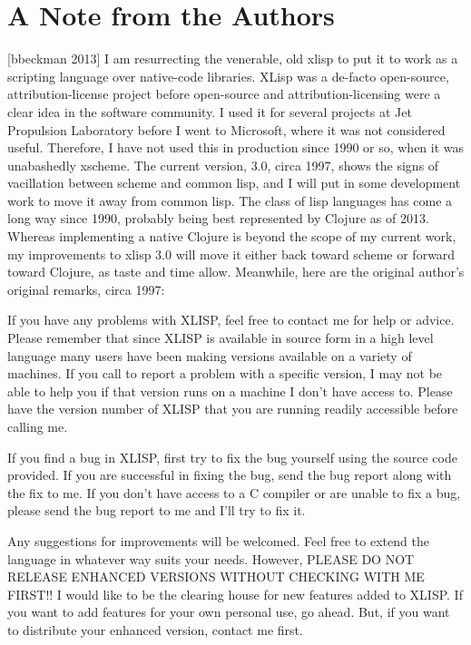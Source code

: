\documentclass[11pt]{article}
\begin{document}
\section{A Note from the Authors}
\label{sec-3}

[bbeckman 2013] I am resurrecting the venerable, old xlisp to put it
to work as a scripting language over native-code libraries.  XLisp was
a de-facto open-source, attribution-license project before open-source
and attribution-licensing were a clear idea in the software community.
I used it for several projects at Jet Propulsion Laboratory before I
went to Microsoft, where it was not considered useful.  Therefore, I
have not used this in production since 1990 or so, when it was
unabashedly xscheme.  The current version, 3.0, circa 1997, shows the
signs of vacillation between scheme and common lisp, and I will put in
some development work to move it away from common lisp.  The class of
lisp languages has come a long way since 1990, probably being best
represented by Clojure as of 2013.  Whereas implementing a native
Clojure is beyond the scope of my current work, my improvements to
xlisp 3.0 will move it either back toward scheme or forward toward
Clojure, as taste and time allow.  Meanwhile, here are the original
author's original remarks, circa 1997:

If you have any problems with XLISP, feel free to contact me for help
or advice.  Please remember that since XLISP is available in source
form in a high level language many users have been making versions
available on a variety of machines.  If you call to report a problem
with a specific version, I may not be able to help you if that version
runs on a machine I don't have access to.  Please have the version
number of XLISP that you are running readily accessible before calling
me.

If you find a bug in XLISP, first try to fix the bug yourself using
the source code provided.  If you are successful in fixing the bug,
send the bug report along with the fix to me.  If you don't have
access to a C compiler or are unable to fix a bug, please send the bug
report to me and I'll try to fix it.

Any suggestions for improvements will be welcomed.  Feel free to
extend the language in whatever way suits your needs.  However, PLEASE
DO NOT RELEASE ENHANCED VERSIONS WITHOUT CHECKING WITH ME FIRST!! I
would like to be the clearing house for new features added to XLISP.
If you want to add features for your own personal use, go ahead.  But,
if you want to distribute your enhanced version, contact me first.
\end{document}
